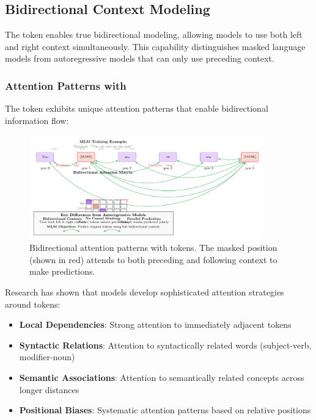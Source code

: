 \subsection{Bidirectional Context Modeling}

The \mask{} token enables true bidirectional modeling, allowing models to use both left and right context simultaneously. This capability distinguishes masked language models from autoregressive models that can only use preceding context.

\subsubsection{Attention Patterns with \mask{}}

The \mask{} token exhibits unique attention patterns that enable bidirectional information flow:

\begin{figure}[htbp]
\centering
\includegraphics[width=0.9\textwidth]{part1/chapter03/fig_mask_attention.pdf}
\caption{Bidirectional attention patterns with \mask{} tokens. The masked position (shown in red) attends to both preceding and following context to make predictions.}
\label{fig:mask_attention}
\end{figure}

Research has shown that models develop sophisticated attention strategies around \mask{} tokens:

\begin{itemize}
\item \textbf{Local Dependencies}: Strong attention to immediately adjacent tokens
\item \textbf{Syntactic Relations}: Attention to syntactically related words (subject-verb, modifier-noun)
\item \textbf{Semantic Associations}: Attention to semantically related concepts across longer distances
\item \textbf{Positional Biases}: Systematic attention patterns based on relative positions
\end{itemize}

